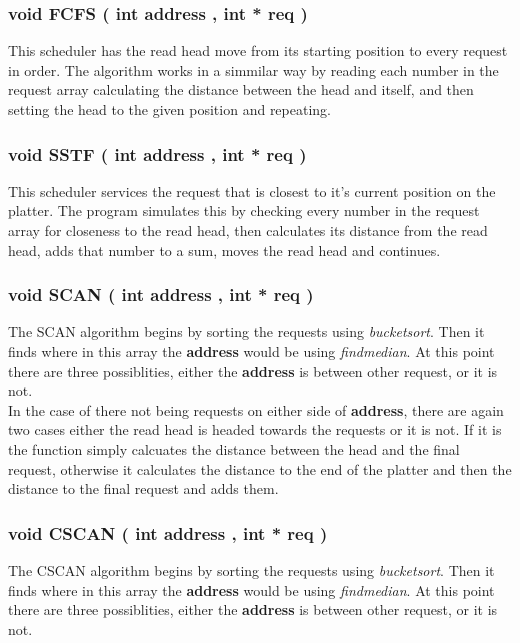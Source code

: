 \documentclass[11pt]{article}
\begin{document}
\subsubsection{ void FCFS ( int address ,  int * req )}
This scheduler has the read head move from its starting position to every request in order. The algorithm works in a simmilar way by reading each number in the request array calculating the distance between the head and itself, and then setting the head to the given position and repeating.


\subsubsection{ void SSTF ( int address ,  int * req )}
This scheduler services the request that is closest to it's current position on the platter. The program simulates this by checking every number in the request array for closeness to the read head, then calculates its distance from the read head, adds that number to a sum, moves the read head and continues.

\subsubsection{ void SCAN ( int address ,  int * req )}
The SCAN algorithm begins by sorting the requests using \textit{bucket\textunderscore sort}. Then it finds where in this array the \textbf{address} would be using \textit{find\textunderscore median}. At this point there are three possiblities, either the \textbf{address} is between other request, or it is not.
\\
In the case of there not being requests on either side of \textbf{address}, there are again two cases either the read head is headed towards the requests or it is not. If it is the function simply calcuates the distance between the head and the final request, otherwise it calculates the distance to the end of the platter and then the distance to the final request and adds them.
\\
  


\subsubsection{ void CSCAN ( int address ,  int * req )}
The CSCAN algorithm begins by sorting the requests using \textit{bucket\textunderscore sort}. Then it finds where in this array the \textbf{address} would be using \textit{find\textunderscore median}. At this point there are three possiblities, either the \textbf{address} is between other request, or it is not.
\end{document}
